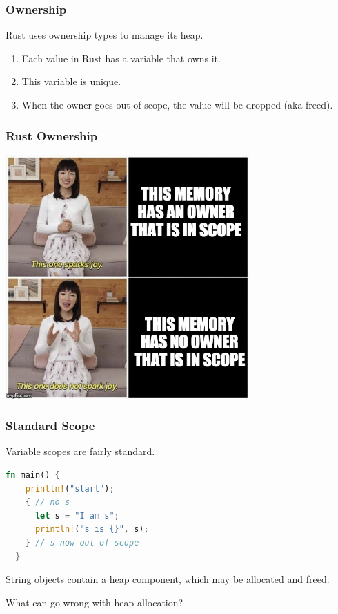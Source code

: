 \begin{frame}
\frametitle{Ownership}
Rust uses ownership types to manage its heap. 

\begin{enumerate}[noitemsep]
\item Each value in Rust has a variable that \alert{owns} it.
\item This variable is \alert{unique}.
\item When the owner goes out of scope, the value will be dropped (aka freed).
\end{enumerate}


\end{frame}


\begin{frame}
\frametitle{Rust Ownership}

\begin{center}
	\includegraphics[width=0.7\textwidth]{images/joy.jpeg}
\end{center}


\end{frame}



\begin{frame}[fragile]
\frametitle{Standard Scope}

Variable scopes are fairly standard.
\begin{lstlisting}[language=Rust]
  fn main() {
    println!("start");
    { // no s
      let s = "I am s";
      println!("s is {}", s);
    } // s now out of scope
  }
\end{lstlisting}

 String objects contain a heap component,
which may be allocated and freed.

What can go wrong with heap allocation?

\end{frame}


